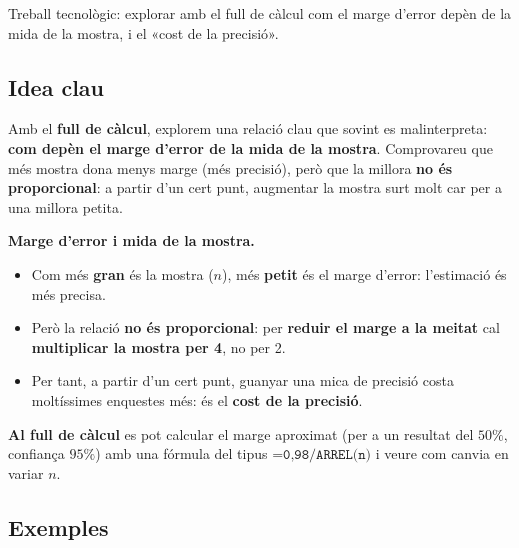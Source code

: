 %
{Treball tecnològic: explorar amb el full de càlcul com el marge d'error depèn de la mida de la mostra, i el «cost de la precisió».}

\subsection{Idea clau}

Amb el \textbf{full de càlcul}, explorem una relació clau que sovint es malinterpreta:
\textbf{com depèn el marge d'error de la mida de la mostra}. Comprovareu que més mostra
dona menys marge (més precisió), però que la millora \textbf{no és proporcional}: a partir
d'un cert punt, augmentar la mostra surt molt car per a una millora petita.

\begin{idea}
\textbf{Marge d'error i mida de la mostra.}
\begin{itemize}[leftmargin=1.4em, itemsep=2pt]
  \item Com més \textbf{gran} és la mostra ($n$), més \textbf{petit} és el marge d'error:
        l'estimació és més precisa.
  \item Però la relació \textbf{no és proporcional}: per \textbf{reduir el marge a la
        meitat} cal \textbf{multiplicar la mostra per 4}, no per 2.
  \item Per tant, a partir d'un cert punt, guanyar una mica de precisió costa moltíssimes
        enquestes més: és el \textbf{cost de la precisió}.
\end{itemize}
\textbf{Al full de càlcul} es pot calcular el marge aproximat (per a un resultat del
$50\%$, confiança $95\%$) amb una fórmula del tipus $\texttt{=0,98/ARREL(n)}$ i veure com
canvia en variar $n$.
\end{idea}

\subsection{Exemples}

